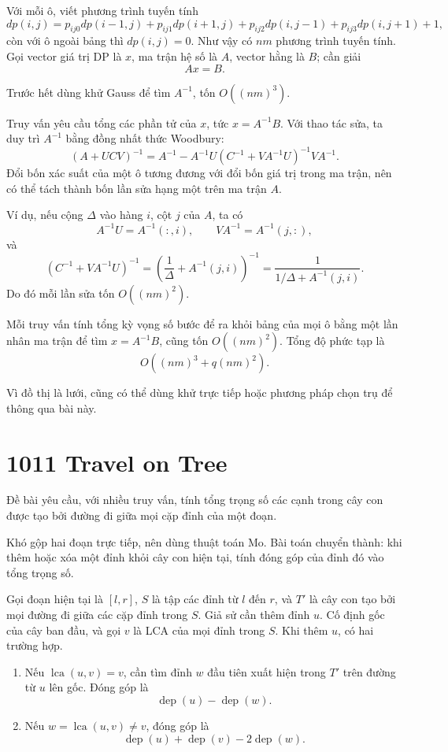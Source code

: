 \documentclass[11pt]{article}
\begin{document}
Với mỗi ô, viết phương trình tuyến tính
\[
  dp(i,j)=p_{ij0}dp(i-1,j)+p_{ij1}dp(i+1,j)
         +p_{ij2}dp(i,j-1)+p_{ij3}dp(i,j+1)+1,
\]
còn với ô ngoài bảng thì $dp(i,j)=0$. Như vậy có $nm$ phương trình tuyến
tính. Gọi vector giá trị DP là $x$, ma trận hệ số là $A$, vector hằng là $B$;
cần giải
\[
  Ax=B.
\]

Trước hết dùng khử Gauss để tìm $A^{-1}$, tốn $O((nm)^3)$.

Truy vấn yêu cầu tổng các phần tử của $x$, tức $x=A^{-1}B$. Với thao tác sửa,
ta duy trì $A^{-1}$ bằng đồng nhất thức Woodbury:
\[
  (A+UCV)^{-1}
  =A^{-1}-A^{-1}U(C^{-1}+VA^{-1}U)^{-1}VA^{-1}.
\]
Đổi bốn xác suất của một ô tương đương với đổi bốn giá trị trong ma trận, nên
có thể tách thành bốn lần sửa hạng một trên ma trận $A$.

Ví dụ, nếu cộng $\Delta$ vào hàng $i$, cột $j$ của $A$, ta có
\[
  A^{-1}U=A^{-1}(:,i),\qquad
  VA^{-1}=A^{-1}(j,:),
\]
và
\[
  (C^{-1}+VA^{-1}U)^{-1}
  =
  \left(\frac{1}{\Delta}+A^{-1}(j,i)\right)^{-1}
  =
  \frac{1}{1/\Delta+A^{-1}(j,i)}.
\]
Do đó mỗi lần sửa tốn $O((nm)^2)$.

Mỗi truy vấn tính tổng kỳ vọng số bước để ra khỏi bảng của mọi ô bằng một
lần nhân ma trận để tìm $x=A^{-1}B$, cũng tốn $O((nm)^2)$. Tổng độ phức tạp
là
\[
  O((nm)^3+q(nm)^2).
\]

Vì đồ thị là lưới, cũng có thể dùng khử trực tiếp hoặc phương pháp chọn trụ
để thông qua bài này.

\section{1011 Travel on Tree}

Đề bài yêu cầu, với nhiều truy vấn, tính tổng trọng số các cạnh trong cây con
được tạo bởi đường đi giữa mọi cặp đỉnh của một đoạn.

Khó gộp hai đoạn trực tiếp, nên dùng thuật toán Mo. Bài toán chuyển thành:
khi thêm hoặc xóa một đỉnh khỏi cây con hiện tại, tính đóng góp của đỉnh đó
vào tổng trọng số.

Gọi đoạn hiện tại là $[l,r]$, $S$ là tập các đỉnh từ $l$ đến $r$, và $T'$ là
cây con tạo bởi mọi đường đi giữa các cặp đỉnh trong $S$. Giả sử cần thêm
đỉnh $u$. Cố định gốc của cây ban đầu, và gọi $v$ là LCA của mọi đỉnh trong
$S$. Khi thêm $u$, có hai trường hợp.

\begin{enumerate}
  \item Nếu $\operatorname{lca}(u,v)=v$, cần tìm đỉnh $w$ đầu tiên xuất hiện
  trong $T'$ trên đường từ $u$ lên gốc. Đóng góp là
  \[
    \operatorname{dep}(u)-\operatorname{dep}(w).
  \]
  \item Nếu $w=\operatorname{lca}(u,v)\ne v$, đóng góp là
  \[
    \operatorname{dep}(u)+\operatorname{dep}(v)-2\operatorname{dep}(w).
  \]
\end{enumerate}
\end{document}
